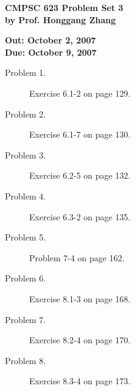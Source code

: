 \documentclass[11pt]{article}
\begin{document}

\begin{center}
{\bf CMPSC 623 Problem Set 3} \\
{\bf by Prof. Honggang Zhang} \\
\end{center}
\begin{center}
{\bf Out: October 2, 2007} \\
{\bf Due: October 9, 2007} \\

\end{center}


\begin{description}




\item[Problem 1.] Exercise 6.1-2 on page 129.

\item[Problem 2.] Exercise 6.1-7 on page 130.


\item[Problem 3.] Exercise 6.2-5 on page 132.

\item[Problem 4.] Exercise 6.3-2 on page 135.



\item[Problem 5.] Problem 7-4 on page 162.

\item[Problem 6.]
Exercise 8.1-3 on page 168.

\item[Problem 7.]
Exercise 8.2-4 on page 170.

\item[Problem 8.]
Exercise 8.3-4 on page 173.

\end{description}
\end{document}
